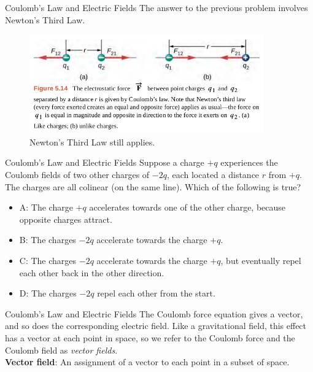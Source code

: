\documentclass{beamer}
\begin{document}
\begin{frame}{Coulomb’s Law and Electric Fields}
The answer to the previous problem involves Newton's Third Law.
\begin{figure}
\centering
\includegraphics[width=0.9\textwidth]{figures/third.png}
\caption{\label{fig:third} Newton's Third Law still applies.}
\end{figure}
\end{frame}

\begin{frame}{Coulomb’s Law and Electric Fields}
Suppose a charge $+q$ experiences the Coulomb fields of two other charges of $-2q$, each located a distance $r$ from $+q$.  The charges are all colinear (on the same line).  Which of the following is true?
\begin{itemize}
\item A: The charge $+q$ accelerates towards one of the other charge, because opposite charges attract.
\item B: The charges $-2q$ accelerate towards the charge $+q$.
\item C: The charges $-2q$ accelerate towards the charge $+q$, but eventually repel each other back in the other direction.
\item D: The charges $-2q$ repel each other from the start.
\end{itemize}
\end{frame}

\begin{frame}{Coulomb’s Law and Electric Fields}
\small
The Coulomb force equation gives a vector, and so does the corresponding electric field.  Like a gravitational field, this effect has a vector at each point in space, so we refer to the Coulomb force and the Coulomb field as \textit{vector fields}. \\ \vspace{0.5cm}
\textbf{Vector field}: An assignment of a vector to each point in a subset of space.
\end{frame}
\end{document}
